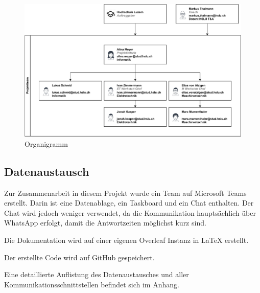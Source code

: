 \begin{figure}[H]
\centering
\includegraphics[width=\textwidth]{img/Projektorganisation.pdf}
\caption{Organigramm}
\label{fig:Organigramm}
\end{figure}

\subsection{Datenaustausch}

Zur Zusammenarbeit in diesem Projekt wurde ein Team auf Microsoft Teams erstellt.
Darin ist eine Datenablage, ein Taskboard und ein Chat enthalten. Der Chat wird jedoch weniger verwendet, da die Kommunikation hauptsächlich über WhatsApp erfolgt, damit die Antwortzeiten möglichst kurz sind.

Die Dokumentation wird auf einer eigenen Overleaf Instanz in LaTeX erstellt.

Der erstellte Code wird auf GitHub gespeichert.

Eine detaillierte Auflistung des Datenaustausches und aller Kommunikationsschnittstellen befindet sich im Anhang.

